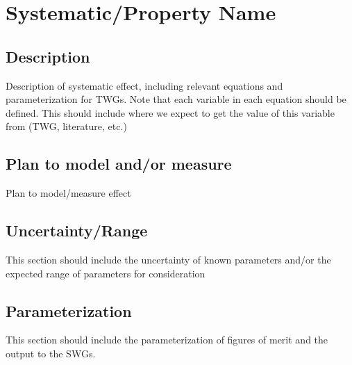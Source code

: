 \section{Systematic/Property Name}

\subsection{Description}
Description of systematic effect, including relevant equations and
parameterization for TWGs. Note that each variable in each equation should be
defined. This should include where we expect to get the value of this variable
from (TWG, literature, etc.)

\subsection{Plan to model and/or measure}
Plan to model/measure effect

\subsection{Uncertainty/Range}
This section should include the uncertainty of
known parameters and/or the expected range of parameters for consideration

\subsection{Parameterization}
This section should include the parameterization of figures of
merit and the output to the SWGs.